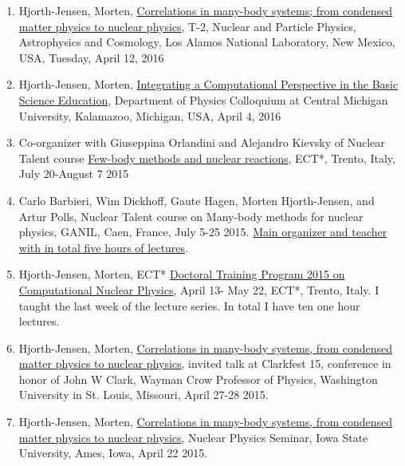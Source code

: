 \documentclass[%
oneside,                 %
final,                   %
10pt]{article}
\begin{document}
\begin{enumerate}
\item Hjorth-Jensen, Morten, \href{{https://t2.lanl.gov/seminars/?section=abstract&number=-10&year=2016}}{Correlations in many-body systems; from condensed matter physics to nuclear physics}, T-2, Nuclear and Particle Physics, Astrophysics and Cosmology, Los Alamos National Laboratory, New Mexico, USA, Tuesday, April 12, 2016

\item Hjorth-Jensen, Morten, \href{{http://mhjensenseminars.github.io/EducationalSeminars/doc/pub/cse/html/cse-reveal.html}}{Integrating a Computational Perspective in the Basic Science Education}, Department of Physics Colloquium at Central  Michigan University,  Kalamazoo, Michigan, USA, April 4, 2016

\item Co-organizer with Giuseppina Orlandini and Alejandro Kievsky of Nuclear Talent course \href{{https://groups.nscl.msu.edu/jina/talent/wiki/Course_3}}{Few-body methods and nuclear reactions}, ECT*, Trento, Italy, July 20-August 7 2015

\item Carlo Barbieri, Wim Dickhoff, Gaute Hagen, Morten Hjorth-Jensen, and Artur Polls, Nuclear Talent course on Many-body methods for nuclear physics, GANIL, Caen, France, July 5-25 2015. \href{{http://nucleartalent.github.io/Course2ManyBodyMethods/doc/web/course.html}}{Main organizer and teacher with in total five hours of lectures}. 

\item Hjorth-Jensen, Morten, ECT* \href{{http://www.ectstar.eu/node/1287}}{Doctoral Training Program 2015 on Computational Nuclear Physics}, April 13- May 22, ECT*, Trento, Italy. I taught the last week of the lecture series. In total I have ten one hour lectures. 

\item Hjorth-Jensen, Morten, \href{{http://clarkfest15.physics.wustl.edu/Docs/intro.php}}{Correlations in many-body systems, from condensed matter physics to nuclear physics}, invited talk at Clarkfest 15,  conference in honor of John W Clark, Wayman Crow Professor of Physics, Washington University in St. Louis, Missouri, April 27-28 2015.

\item Hjorth-Jensen, Morten, \href{{http://www.event.iastate.edu/event/35628}}{Correlations in many-body systems, from condensed matter physics to nuclear physics}, Nuclear Physics Seminar, Iowa State University, Ames, Iowa, April 22 2015.


\end{enumerate}
\end{document}
